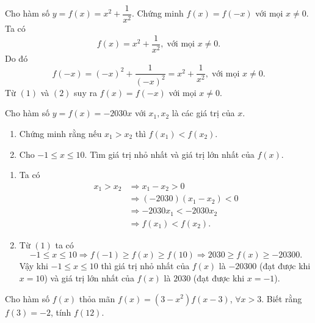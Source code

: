 \begin{vd}
Cho hàm số $y=f(x)=x^2+\dfrac{1}{x^2}$. Chứng minh $f(x)=f(-x)$ với mọi $x\ne 0.$
\loigiai
{
Ta có \[f(x)=x^2+\dfrac{1}{x^2},\;\text{với mọi $x\ne 0$}.\tag{1}\]
Do đó
\[f(-x)=(-x)^2+\dfrac{1}{(-x)^2}=x^2+\dfrac{1}{x^2},\;\text{với mọi $x\ne 0$}.\tag{2}\]
Từ $(1)$ và $(2)$ suy ra $f(x)=f(-x)$ với mọi $x\ne 0.$
}
\end{vd}
\begin{vd}
Cho hàm số $y=f(x)=-2030x$ với $x_1, x_2$ là các giá trị của $x$.
\begin{enumerate}
\item Chứng minh rằng nếu $x_1>x_2$ thì $f(x_1)<f(x_2)$.
\item Cho $-1\le x\le 10$. Tìm giá trị nhỏ nhất và giá trị lớn nhất của $f(x)$.
\end{enumerate}
\loigiai
{
\begin{enumerate}
\item Ta có
\begin{align*}
x_1>x_2&\Rightarrow x_1-x_2>0\\ 
&\Rightarrow (-2030)\left(x_1-x_2\right)<0\\ 
&\Rightarrow -2030x_1<-2030x_2\\ 
&\Rightarrow f(x_1)<f(x_2).\tag{1}
\end{align*}
\item Từ $(1)$ ta có
\[-1\le x\le 10\Rightarrow f(-1)\ge f(x)\ge f(10)\Rightarrow 2030\ge f(x)\ge -20300.\]
Vậy khi $-1\le x\le 10$ thì giá trị nhỏ nhất của $f(x)$ là $-20300$ (đạt được khi $x=10$) và giá trị lớn nhất của $f(x)$ là $2030$ (đạt được khi $x=-1$).
\end{enumerate}
}
\end{vd}
\begin{vd}
Cho hàm số $f(x)$ thỏa mãn $f(x)=(3-x^2)f(x-3)$, $\forall x>3$. Biết rằng $f(3)=-2$, tính $f(12)$.
\end{vd}
